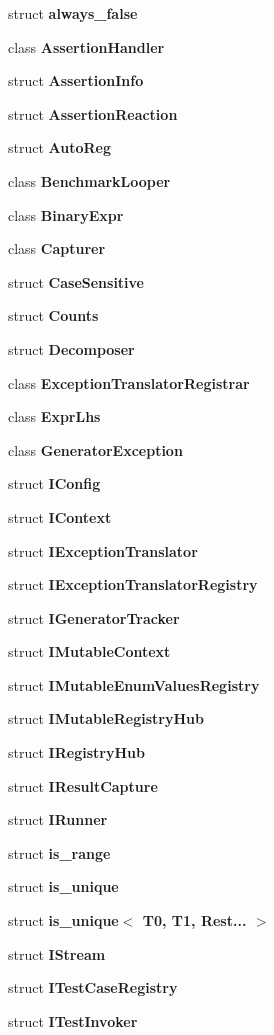 \begin{DoxyCompactItemize}
\item 
struct \textbf{ always\+\_\+false}
\item 
class \textbf{ Assertion\+Handler}
\item 
struct \textbf{ Assertion\+Info}
\item 
struct \textbf{ Assertion\+Reaction}
\item 
struct \textbf{ Auto\+Reg}
\item 
class \textbf{ Benchmark\+Looper}
\item 
class \textbf{ Binary\+Expr}
\item 
class \textbf{ Capturer}
\item 
struct \textbf{ Case\+Sensitive}
\item 
struct \textbf{ Counts}
\item 
struct \textbf{ Decomposer}
\item 
class \textbf{ Exception\+Translator\+Registrar}
\item 
class \textbf{ Expr\+Lhs}
\item 
class \textbf{ Generator\+Exception}
\item 
struct \textbf{ I\+Config}
\item 
struct \textbf{ I\+Context}
\item 
struct \textbf{ I\+Exception\+Translator}
\item 
struct \textbf{ I\+Exception\+Translator\+Registry}
\item 
struct \textbf{ I\+Generator\+Tracker}
\item 
struct \textbf{ I\+Mutable\+Context}
\item 
struct \textbf{ I\+Mutable\+Enum\+Values\+Registry}
\item 
struct \textbf{ I\+Mutable\+Registry\+Hub}
\item 
struct \textbf{ I\+Registry\+Hub}
\item 
struct \textbf{ I\+Result\+Capture}
\item 
struct \textbf{ I\+Runner}
\item 
struct \textbf{ is\+\_\+range}
\item 
struct \textbf{ is\+\_\+unique}
\item 
struct \textbf{ is\+\_\+unique$<$ T0, T1, Rest... $>$}
\item 
struct \textbf{ I\+Stream}
\item 
struct \textbf{ I\+Test\+Case\+Registry}
\item 
struct \textbf{ I\+Test\+Invoker}

\end{DoxyCompactItemize}
